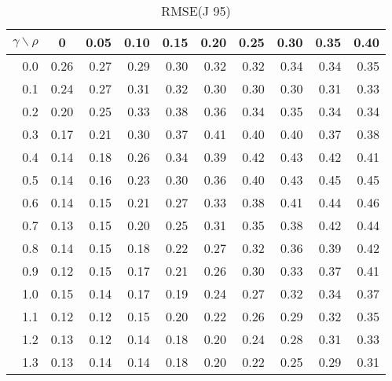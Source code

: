 \documentclass[12pt]{article}
\begin{document}
%
\begin{table}[!tbp]
\caption{RMSE(J 95)}
 \begin{center}
 \begin{tabular}{r|rrrrrrrrr}\hline\hline
\multicolumn{1}{c|}{$\gamma\backslash\rho$}&\multicolumn{1}{c}{0}&\multicolumn{1}{c}{0.05}&\multicolumn{1}{c}{0.10}&\multicolumn{1}{c}{0.15}&\multicolumn{1}{c}{0.20}&\multicolumn{1}{c}{0.25}&\multicolumn{1}{c}{0.30}&\multicolumn{1}{c}{0.35}&\multicolumn{1}{c}{0.40}\tabularnewline
\hline
0.0&0.26&0.27&0.29&0.30&0.32&0.32&0.34&0.34&0.35\tabularnewline
0.1&0.24&0.27&0.31&0.32&0.30&0.30&0.30&0.31&0.33\tabularnewline
0.2&0.20&0.25&0.33&0.38&0.36&0.34&0.35&0.34&0.34\tabularnewline
0.3&0.17&0.21&0.30&0.37&0.41&0.40&0.40&0.37&0.38\tabularnewline
0.4&0.14&0.18&0.26&0.34&0.39&0.42&0.43&0.42&0.41\tabularnewline
0.5&0.14&0.16&0.23&0.30&0.36&0.40&0.43&0.45&0.45\tabularnewline
0.6&0.14&0.15&0.21&0.27&0.33&0.38&0.41&0.44&0.46\tabularnewline
0.7&0.13&0.15&0.20&0.25&0.31&0.35&0.38&0.42&0.44\tabularnewline
0.8&0.14&0.15&0.18&0.22&0.27&0.32&0.36&0.39&0.42\tabularnewline
0.9&0.12&0.15&0.17&0.21&0.26&0.30&0.33&0.37&0.41\tabularnewline
1.0&0.15&0.14&0.17&0.19&0.24&0.27&0.32&0.34&0.37\tabularnewline
1.1&0.12&0.12&0.15&0.20&0.22&0.26&0.29&0.32&0.35\tabularnewline
1.2&0.13&0.12&0.14&0.18&0.20&0.24&0.28&0.31&0.33\tabularnewline
1.3&0.13&0.14&0.14&0.18&0.20&0.22&0.25&0.29&0.31\tabularnewline
\hline
\end{tabular}

\end{center}

\end{table}
\end{document}
